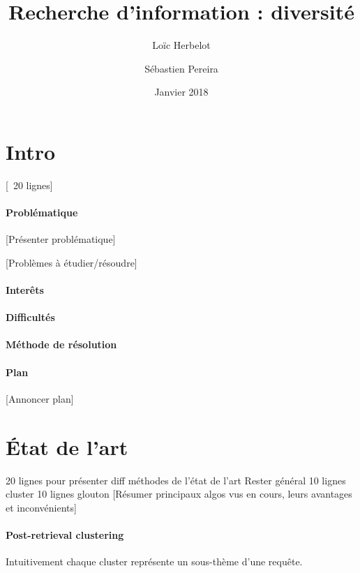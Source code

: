 \documentclass{article}
\title{Recherche d'information : diversité}
\date{Janvier 2018}
\author{
   Loïc Herbelot
   \and
   Sébastien Pereira
  }
\begin{document}
\maketitle 


\tableofcontents{}


\begin{multicols}{2}

\section{Intro}
[~20 lignes]
\paragraph{Problématique}

[Présenter problématique]

[Problèmes à étudier/résoudre]

\paragraph{Interêts}

\paragraph{Difficultés}

\paragraph{Méthode de résolution}

\paragraph{Plan}
[Annoncer plan]

\section{État de l'art}
20 lignes pour présenter diff méthodes de l'état de l'art
Rester général
10 lignes cluster
10 lignes glouton
[Résumer principaux algos vus en cours, leurs avantages et inconvénients]
\paragraph{Post-retrieval clustering}
Intuitivement chaque cluster représente un sous-thème d'une requête.


\end{multicols}
\end{document}
